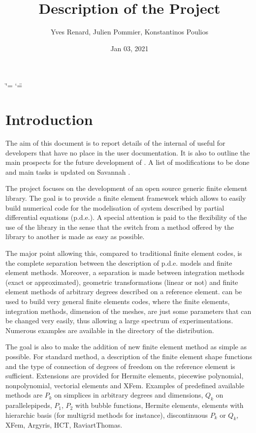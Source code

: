 \documentclass[a4paper,11pt,english]{sphinxmanual}
\title{Description of the Project}
\date{Jan 03, 2021}
\author{Yves Renard, Julien Pommier, Konstantinos Poulios}
\begin{document}
\ifdefined\shorthandoff
  \ifnum\catcode`\=\string=\active\shorthandoff{=}\fi
  \ifnum\catcode`\"=\active{}\fi
\fi

\pagestyle{empty}
\sphinxmaketitle
\pagestyle{plain}
\sphinxtableofcontents
\pagestyle{normal}
\label{\detokenize{project/index::doc}}



\chapter{Introduction}
\label{\detokenize{project/intro:introduction}}\label{\detokenize{project/intro:dp-intro}}\label{\detokenize{project/intro::doc}}
The aim of this document is to report details of the internal of 
useful for developers that have no place in the user documentation.
It is also to outline the main prospects for the future development
of . A list of modifications to be done and main tasks is updated
on Savannah .

The  project focuses on the development of an open source generic
finite element library.
The goal is to provide a finite element framework which allows to
easily build numerical code for the modelisation of system described
by partial differential equations (p.d.e.). A special attention is paid
to the flexibility of the use of the library in the sense that the
switch from a method offered by the library to another is made as easy
as possible.

The major point allowing this, compared to traditional finite element
codes, is the complete separation between the description of p.d.e.
models and finite element methods. Moreover, a separation is made
between integration methods (exact or approximated), geometric
transformations (linear or not) and finite element methods of
arbitrary degrees described on a reference element.  can
be used to build very general finite elements codes, where the
finite elements, integration methods, dimension of the meshes,
are just some parameters that can
be changed very easily, thus allowing a large spectrum of experimentations.
Numerous examples are available in the  directory of the
distribution.

The goal is also to make the addition of new finite element method
as simple as possible. For standard method, a description of the
finite element shape functions and the type of connection of degrees
of freedom on the reference element is sufficient. Extensions are
provided for Hermite elements, piecewise polynomial, non\sphinxhyphen{}polynomial,
vectorial elements and XFem. Examples of predefined
available methods are \(P_k\) on simplices in arbitrary degrees and
dimensions, \(Q_k\) on parallelepipeds, \(P_1\), \(P_2\)
with bubble functions, Hermite elements, elements with hierarchic
basis (for multigrid methods for instance),
discontinuous \(P_k\) or \(Q_k\), XFem, Argyris, HCT, Raviart\sphinxhyphen{}Thomas.
\end{document}
